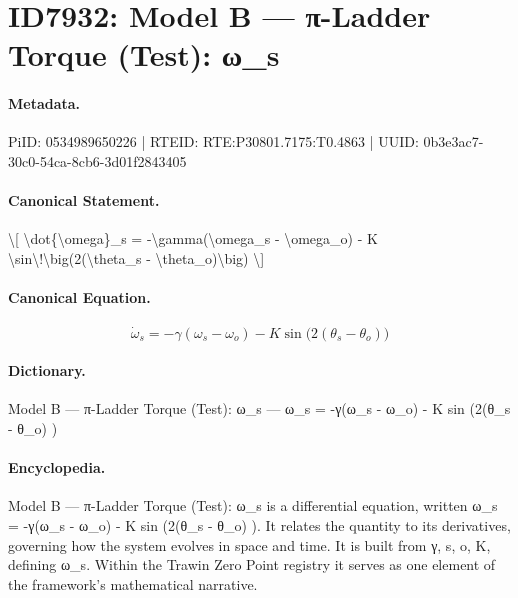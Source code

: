 \section*{ID7932: Model B — π-Ladder Torque (Test): ω\_s}
\paragraph{Metadata.}
PiID: 0534989650226 | RTEID: RTE:P30801.7175:T0.4863 | UUID: 0b3e3ac7-30c0-54ca-8cb6-3d01f2843405

\paragraph{Canonical Statement.}
\textbackslash{}[ \textbackslash{}dot\{\textbackslash{}omega\}\_s = -\textbackslash{}gamma(\textbackslash{}omega\_s - \textbackslash{}omega\_o) - K \textbackslash{}sin\textbackslash{}!\textbackslash{}big(2(\textbackslash{}theta\_s - \textbackslash{}theta\_o)\textbackslash{}big) \textbackslash{}]

\paragraph{Canonical Equation.}
\[
\dot{\omega}_s = -\gamma(\omega_s - \omega_o) - K \sin\!\big(2(\theta_s - \theta_o)\big)
\]

\paragraph{Dictionary.}
Model B — π-Ladder Torque (Test): ω\_s — ω\_s = -γ(ω\_s - ω\_o) - K sin (2(θ\_s - θ\_o) )

\paragraph{Encyclopedia.}
Model B — π-Ladder Torque (Test): ω\_s is a differential equation, written ω\_s = -γ(ω\_s - ω\_o) - K sin (2(θ\_s - θ\_o) ). It relates the quantity to its derivatives, governing how the system evolves in space and time. It is built from γ, s, o, K, defining ω\_s. Within the Trawin Zero Point registry it serves as one element of the framework's mathematical narrative.
